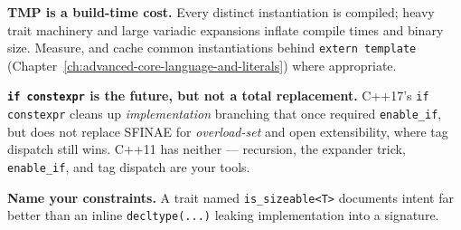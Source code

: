 \textbf{TMP is a build-time cost.} Every distinct instantiation is compiled; heavy trait machinery and large variadic expansions inflate compile times and binary size. Measure, and cache common instantiations behind \texttt{extern template} (Chapter~\ref{ch:advanced-core-language-and-literals}) where appropriate.

\textbf{\texttt{if constexpr} is the future, but not a total replacement.} C++17's \texttt{if constexpr} cleans up \emph{implementation} branching that once required \texttt{enable\_if}, but does not replace SFINAE for \emph{overload-set} and open extensibility, where tag dispatch still wins. C++11 has neither --- recursion, the expander trick, \texttt{enable\_if}, and tag dispatch are your tools.

\textbf{Name your constraints.} A trait named \texttt{is\_sizeable<T>} documents intent far better than an inline \texttt{decltype(...)} leaking implementation into a signature.
